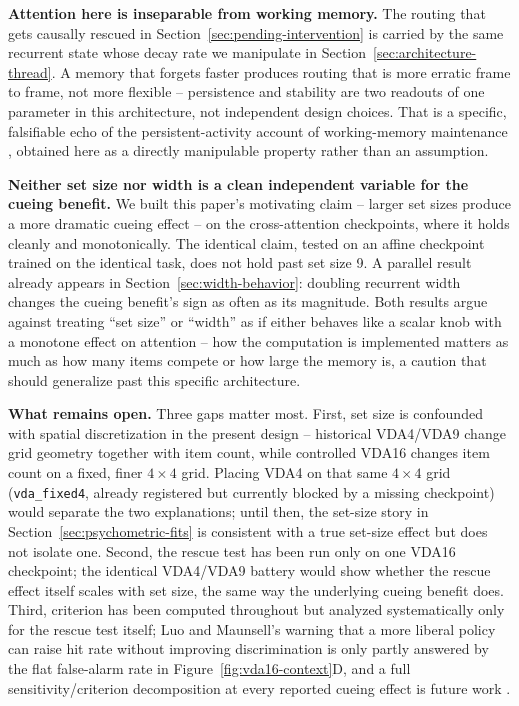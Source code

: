 \documentclass[10pt]{article}
\newcommand{\env}[1]{\texttt{#1}}
\begin{document}
\textbf{Attention here is inseparable from working memory.} The routing that gets causally rescued in Section~\ref{sec:pending-intervention} is carried by the same recurrent state whose decay rate we manipulate in Section~\ref{sec:architecture-thread}. A memory that forgets faster produces routing that is more erratic frame to frame, not more flexible -- persistence and stability are two readouts of one parameter in this architecture, not independent design choices. That is a specific, falsifiable echo of the persistent-activity account of working-memory maintenance \cite{luck1997,awh2001}, obtained here as a directly manipulable property rather than an assumption.

\textbf{Neither set size nor width is a clean independent variable for the cueing benefit.} We built this paper's motivating claim -- larger set sizes produce a more dramatic cueing effect -- on the cross-attention checkpoints, where it holds cleanly and monotonically. The identical claim, tested on an affine checkpoint trained on the identical task, does not hold past set size 9. A parallel result already appears in Section~\ref{sec:width-behavior}: doubling recurrent width changes the cueing benefit's sign as often as its magnitude. Both results argue against treating ``set size'' or ``width'' as if either behaves like a scalar knob with a monotone effect on attention -- how the computation is implemented matters as much as how many items compete or how large the memory is, a caution that should generalize past this specific architecture.

\textbf{What remains open.} Three gaps matter most. First, set size is confounded with spatial discretization in the present design -- historical VDA4/VDA9 change grid geometry together with item count, while controlled VDA16 changes item count on a fixed, finer $4\times4$ grid. Placing VDA4 on that same $4\times4$ grid (\env{vda\_fixed4}, already registered but currently blocked by a missing checkpoint) would separate the two explanations; until then, the set-size story in Section~\ref{sec:psychometric-fits} is consistent with a true set-size effect but does not isolate one. Second, the rescue test has been run only on one VDA16 checkpoint; the identical VDA4/VDA9 battery would show whether the rescue effect itself scales with set size, the same way the underlying cueing benefit does. Third, criterion has been computed throughout but analyzed systematically only for the rescue test itself; Luo and Maunsell's warning that a more liberal policy can raise hit rate without improving discrimination is only partly answered by the flat false-alarm rate in Figure~\ref{fig:vda16-context}D, and a full sensitivity/criterion decomposition at every reported cueing effect is future work \cite{luo2018}.
\end{document}
